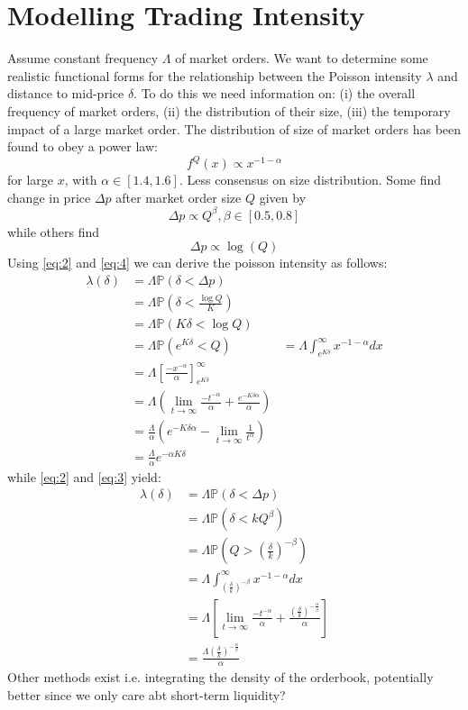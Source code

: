 \section{Modelling Trading Intensity}
Assume constant frequency $\Lambda$ of market orders. We want to determine some realistic functional forms for the relationship between the Poisson intensity $\lambda$ and distance to mid-price $\delta$. 
To do this we need information on: (i) the overall frequency of market orders, (ii) the distribution of their size, (iii) the temporary impact of a large market order. The distribution of size of market orders has been found to obey a power law:
\begin{equation}\label{eq:2}
    f^{Q}(x)\propto x^{-1-\alpha}
\end{equation}
for large $x$, with $\alpha\in[1.4,1.6].$
Less consensus on size distribution. Some find change in price $\Delta p$ after market order size $Q$ given by 
\begin{equation}\label{eq:3}
    \Delta p\propto Q^\beta, \beta\in[0.5,0.8]
\end{equation}
while others find
\begin{equation}\label{eq:4}
    \Delta p\propto\log(Q)
\end{equation}
Using \ref{eq:2} and \ref{eq:4} we can derive the poisson intensity as follows:
\begin{align*}
    \lambda(\delta)&=\Lambda\mathbb{P}(\delta<\Delta p)\\
    &=\Lambda\mathbb{P}\left(\delta<\frac{\log Q}{K}\right)\\
    &=\Lambda\mathbb{P}(K\delta<\log Q)\\
    &=\Lambda\mathbb{P}\left(e^{K\delta}<Q\right)
    &=\Lambda\int_{e^{K\delta}}^{\infty}x^{-1-\alpha}dx\\
    &=\Lambda\left[\frac{-x^{-\alpha}}{\alpha}\right]_{e^{K\delta}}^\infty\\
    &=\Lambda\left(\lim_{t\rightarrow\infty}\frac{-t^{-\alpha}}{\alpha}+\frac{e^{-K\delta\alpha}}{\alpha}\right)\\
    &=\frac{\Lambda}{\alpha}\left(e^{-K\delta\alpha}-\lim_{t\rightarrow\infty}\frac{1}{t^\alpha}\right)\\
    &=\frac{\Lambda}{\alpha}e^{-\alpha K\delta}
\end{align*}
while \ref{eq:2} and \ref{eq:3} yield:
\begin{align*}
    \lambda(\delta)&=\Lambda\mathbb{P}(\delta<\Delta p)\\
    &=\Lambda\mathbb{P}(\delta<kQ^\beta)\\
    &=\Lambda\mathbb{P}\left(Q>\left(\frac{\delta}{k}\right)^{-\beta}\right)\\
    &=\Lambda\int_{\left(\frac{\delta}{k}\right)^{-\beta}}^\infty x^{-1-\alpha}dx\\
    &=\Lambda\left[\lim_{t\rightarrow\infty}\frac{-t^{-\alpha}}{\alpha}+\frac{\left(\frac{\delta}{k}\right)^{-\frac{\alpha}{\beta}}}{\alpha}\right]\\
    &=\frac{\Lambda\left(\frac{\delta}{k}\right)^{-\frac{\alpha}{\beta}}}{\alpha}
\end{align*}
Other methods exist i.e. integrating the density of the orderbook, potentially better since we only care abt short-term liquidity?

